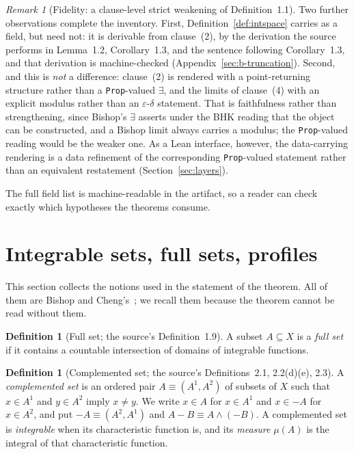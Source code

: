 \documentclass[11pt]{article}
\theoremstyle{definition}
\newtheorem{definition}[theorem]{Definition}
\theoremstyle{remark}
\newtheorem{remark}[theorem]{Remark}
\begin{document}
\begin{remark}[Fidelity: a clause-level strict weakening of Definition~1.1]
Two further observations complete the inventory.  First, Definition~\ref{def:intspace} carries  as a field, but need not: it is derivable from clause~(2), by the derivation the source performs in Lemma~1.2, Corollary~1.3, and the sentence following Corollary~1.3, and that derivation is machine-checked (Appendix~\ref{sec:b-truncation}).  Second, and this is \emph{not} a difference: clause~(2) is rendered with a point-returning structure rather than a \texttt{Prop}-valued $\exists$, and the limits of clause~(4) with an explicit modulus rather than an $\varepsilon$-$\delta$ statement.  That is faithfulness rather than strengthening, since Bishop's $\exists$ asserts under the BHK reading that the object can be constructed, and a Bishop limit always carries a modulus; the \texttt{Prop}-valued reading would be the weaker one.  As a Lean interface, however, the data-carrying rendering is a data refinement of the corresponding \texttt{Prop}-valued statement rather than an equivalent restatement (Section~\ref{sec:layers}).

The full field list is machine-readable in the artifact, so a reader can check exactly which hypotheses the theorems consume.
\end{remark}

\section{Integrable sets, full sets, profiles}
\label{sec:definitions}

This section collects the notions used in the statement of the theorem.  All of them are Bishop and Cheng's~\cite{bishop-cheng-1972}; we recall them because the theorem cannot be read without them.

\begin{definition}[Full set; the source's Definition~1.9]
\label{def:full}
A subset $A\subseteq X$ is a \emph{full set} if it contains a countable intersection of domains of integrable functions.
\end{definition}

\begin{definition}[Complemented set; the source's Definitions~2.1, 2.2(d)(e), 2.3]
\label{def:complemented}
A \emph{complemented set} is an ordered pair $A\equiv(A^1,A^2)$ of subsets of $X$ such that $x\in A^1$ and $y\in A^2$ imply $x\ne y$.  We write $x\in A$ for $x\in A^1$ and $x\in -A$ for $x\in A^2$, and put $-A\equiv (A^2,A^1)$ and $A-B\equiv A\wedge(-B)$.  A complemented set is \emph{integrable} when its characteristic function is, and its \emph{measure} $\mu(A)$ is the integral of that characteristic function.
\end{definition}
\end{document}
